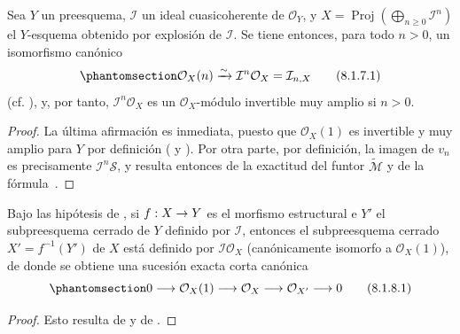 \documentclass[oneside,10pt]{amsart}
\makeatletter
\renewcommand{\geq}{\geqslant}
\newcommand{\ega@arrow}[2]{\mathchoice{#1}{#2}{#2}{#2}}
\renewcommand{\to}{\ega@arrow{\longrightarrow}{\rightarrow}}
\newcommand{\oldpage}[2][]{\marginnote{\normalfont\footnotesize\textbf{#1}~|~#2}\ignorespaces}
\let\EGAOriginalLabel\label
\renewcommand{\label}[1]{\phantomsection\EGAOriginalLabel{#1}}
\makeatother
\begin{document}
\oldpage[II]{156}

\begin{proposition}[8.1.7]
\label{II.8.1.7-fr}
Sea $Y$ un preesquema, $\mathcal{I}$ un ideal cuasicoherente de $\mathcal{O}_Y$, y $X=\operatorname{Proj}(\bigoplus_{n\geq0}\mathcal{I}^n)$ el $Y$-esquema obtenido por explosión de $\mathcal{I}$.
Se tiene entonces, para todo $n>0$, un isomorfismo canónico
\begin{equation}
\label{II.8.1.7.1-fr}
  \mathcal{O}_X(n)\xrightarrow{\sim}\mathcal{I}^n\mathcal{O}_X
  =\mathcal{I}_{n,X}
\tag{8.1.7.1}
\end{equation}
\textup{(cf. )}, y, por tanto, $\mathcal{I}^n\mathcal{O}_X$ es un $\mathcal{O}_X$-módulo invertible muy amplio si $n>0$.
\end{proposition}

\begin{proof}
La última afirmación es inmediata, puesto que $\mathcal{O}_X(1)$ es invertible  y muy amplio para $Y$ por definición ( y ).
Por otra parte, por definición, la imagen de $v_n$ es precisamente $\mathcal{I}^n\mathcal{S}$, y  resulta entonces de la exactitud del funtor $\widetilde{\mathcal{M}}$  y de la fórmula~.
\end{proof}

\begin{corollary}[8.1.8]
\label{II.8.1.8-fr}
Bajo las hipótesis de , si $f:X\to Y$ es el morfismo estructural e $Y'$ el subpreesquema cerrado de $Y$ definido por $\mathcal{I}$, entonces el subpreesquema cerrado $X'=f^{-1}(Y')$ de $X$ está definido por $\mathcal{I}\mathcal{O}_X$ (canónicamente isomorfo a $\mathcal{O}_X(1)$), de donde se obtiene una sucesión exacta corta canónica
\begin{equation}
\label{II.8.1.8.1-fr}
  0\to\mathcal{O}_X(1)\to\mathcal{O}_X\to\mathcal{O}_{X'}\to0
\tag{8.1.8.1}
\end{equation}
\end{corollary}

\begin{proof}
Esto resulta de  y de .
\end{proof}
\end{document}
